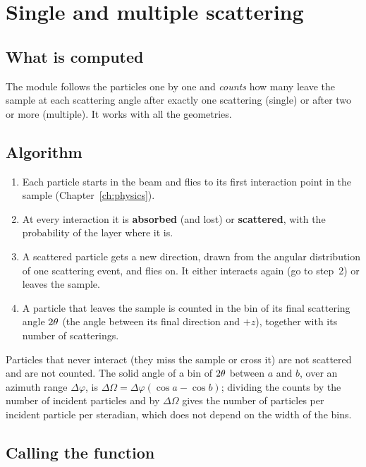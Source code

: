 \chapter{Single and multiple scattering}
\label{ch:scattering}

\section{What is computed}

The module  follows the particles one by one and \emph{counts} how many leave the sample at each scattering
angle after exactly one scattering (single) or after two or more (multiple). It works with all the geometries.

\section{Algorithm}

\begin{enumerate}
  \item Each particle starts in the beam and flies to its first interaction point in the sample (Chapter~\ref{ch:physics}).
  \item At every interaction it is \textbf{absorbed} (and lost) or \textbf{scattered}, with the probability  of the layer
        where it is.
  \item A scattered particle gets a new direction, drawn from the angular distribution of one scattering event, and flies on. It either interacts
        again (go to step~2) or leaves the sample.
  \item A particle that leaves the sample is counted in the bin of its final scattering angle $2\theta$ (the angle between its final direction
        and $+z$), together with its number of scatterings.
\end{enumerate}
Particles that never interact (they miss the sample or cross it) are not scattered and are not counted. The solid angle of a bin of
$2\theta$ between $a$ and $b$, over an azimuth range $\Delta\varphi$, is $\Delta\Omega=\Delta\varphi(\cos a-\cos b)$; dividing the counts by
the number of incident particles and by $\Delta\Omega$ gives the number of particles per incident particle per steradian, which does not depend
on the width of the bins.

\section{Calling the function}

